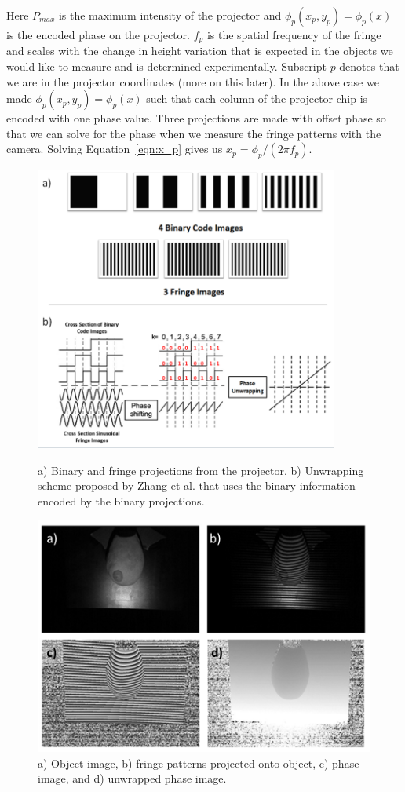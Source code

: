 Here $P_{max}$ is the maximum intensity of the projector and $\phi_p(x_p,y_p)=\phi_p(x)$ is the encoded phase on the projector. $f_p$ is the spatial frequency of the fringe and scales with the change in height variation that is expected in the objects we would like to measure and is determined experimentally. Subscript $p$ denotes that we are in the projector coordinates (more on this later). In the above case we made $\phi_p(x_p,y_p)=\phi_p(x)$ such that each column of the projector chip is encoded with one phase value. Three projections are made with offset phase so that we can solve for the phase when we measure the fringe patterns with the camera. Solving Equation~\ref{eqn:x_p} gives us $x_p=\phi_p/(2\pi f_p)$.
\begin{figure}[ph]
\centering
\includegraphics[width=10cm]{./figures/4_Gen3/profunwrap.png}
\caption[Fringe projection unwrapping scheme]{a) Binary and fringe projections from the projector. b) Unwrapping scheme proposed by Zhang et al. that uses the binary information encoded by the binary projections.}
\label{fig:profunwrap}
\vspace{5mm}
\includegraphics[width=13cm]{./figures/4_Gen3/proffringe.png}
\caption[Profilometry projections]{a) Object image, b) fringe patterns projected onto object, c) phase image, and d) unwrapped phase image.}
\label{fig:proffringe}
\end{figure}


